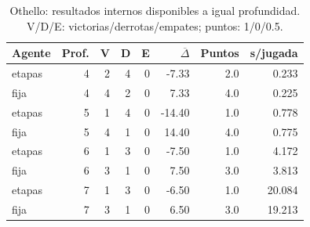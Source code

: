 \begin{table}[htbp]
\centering\small
\caption{Othello: resultados internos disponibles a igual profundidad. V/D/E: victorias/derrotas/empates; puntos: 1/0/0.5.}
\label{tab:othello_resultados}
\begin{tabular}{lrrrrrrr}
\toprule
Agente & Prof. & V & D & E & $\overline{\Delta}$ & Puntos & s/jugada \\
\midrule
etapas & 4 & 2 & 4 & 0 & -7.33 & 2.0 & 0.233 \\
fija & 4 & 4 & 2 & 0 & 7.33 & 4.0 & 0.225 \\
etapas & 5 & 1 & 4 & 0 & -14.40 & 1.0 & 0.778 \\
fija & 5 & 4 & 1 & 0 & 14.40 & 4.0 & 0.775 \\
etapas & 6 & 1 & 3 & 0 & -7.50 & 1.0 & 4.172 \\
fija & 6 & 3 & 1 & 0 & 7.50 & 3.0 & 3.813 \\
etapas & 7 & 1 & 3 & 0 & -6.50 & 1.0 & 20.084 \\
fija & 7 & 3 & 1 & 0 & 6.50 & 3.0 & 19.213 \\
\bottomrule
\end{tabular}
\end{table}
